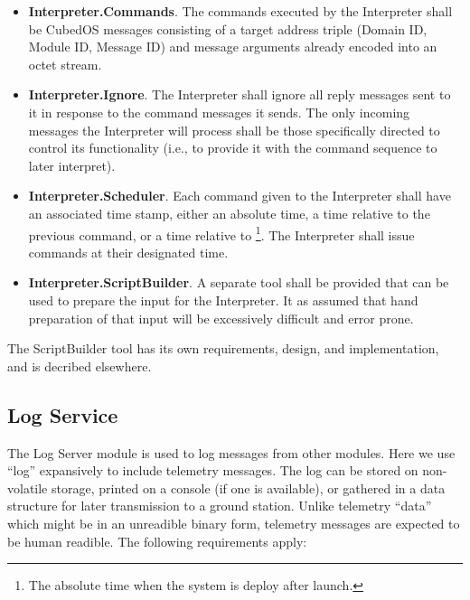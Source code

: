 \begin{itemize}
\item \textbf{Interpreter.Commands}. The commands executed by the Interpreter shall be CubedOS
  messages consisting of a target address triple (Domain ID, Module ID, Message ID) and message
  arguments already encoded into an octet stream.
\item \textbf{Interpreter.Ignore}. The Interpreter shall ignore all reply messages sent to it in
  response to the command messages it sends. The only incoming messages the Interpreter will
  process shall be those specifically directed to control its functionality (i.e., to provide it
  with the command sequence to later interpret).
\item \textbf{Interpreter.Scheduler}. Each command given to the Interpreter shall have an
  associated time stamp, either an absolute time, a time relative to the previous command, or a
  time relative to \footnote{The absolute time when the system is
    deploy after launch.}. The Interpreter shall issue commands at their designated time.
\item \textbf{Interpreter.ScriptBuilder}. A separate tool shall be provided that can be used to
  prepare the input for the Interpreter. It as assumed that hand preparation of that input will
  be excessively difficult and error prone.
\end{itemize}

The ScriptBuilder tool has its own requirements, design, and implementation, and is decribed
elsewhere.

\subsection{Log Service}
\label{sec:log-service}

The Log Server module is used to log messages from other modules.  Here
we use ``log'' expansively to include telemetry messages. The log can be stored on non-volatile
storage, printed on a console (if one is available), or gathered in a data structure for later
transmission to a ground station. Unlike telemetry ``data'' which might be in an unreadible
binary form, telemetry messages are expected to be human readible. The following requirements
apply:

